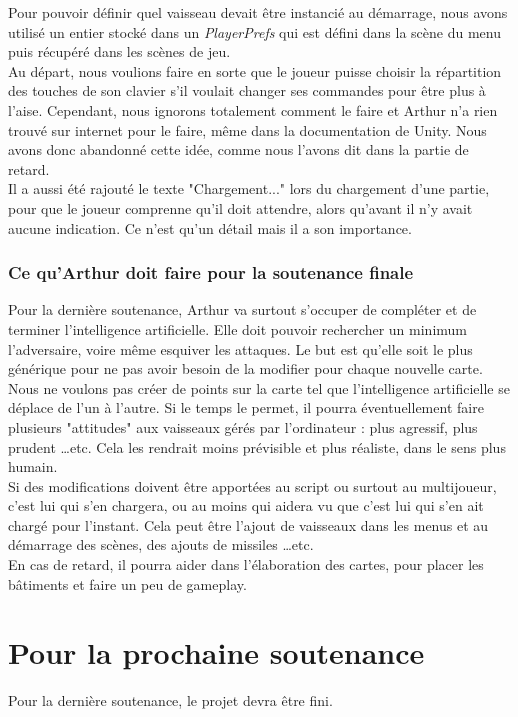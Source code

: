 \documentclass[10pt, titlepage]{report}
\begin{document}
Pour pouvoir définir quel vaisseau devait être instancié au démarrage, nous avons utilisé un entier stocké dans un \textit{PlayerPrefs} qui est défini dans la scène du menu puis récupéré dans les scènes de jeu.\\

Au départ, nous voulions faire en sorte que le joueur puisse choisir la répartition des touches de son clavier s'il voulait changer ses commandes pour être plus à l'aise. Cependant, nous ignorons totalement comment le faire et Arthur n'a rien trouvé sur internet pour le faire, même dans la documentation de Unity. Nous avons donc abandonné cette idée, comme nous l'avons dit dans la partie de retard.\\

Il a aussi été rajouté le texte "Chargement..." lors du chargement d'une partie, pour que le joueur comprenne qu'il doit attendre, alors qu'avant il n'y avait aucune indication. Ce n'est qu'un détail mais il a son importance.\\

\subsection{Ce qu'Arthur doit faire pour la soutenance finale}
Pour la dernière soutenance, Arthur va surtout s'occuper de compléter et de terminer l'intelligence artificielle. Elle doit pouvoir rechercher un minimum l'adversaire, voire même esquiver les attaques. Le but est qu'elle soit le plus générique pour ne pas avoir besoin de la modifier pour chaque nouvelle carte. Nous ne voulons pas créer de points sur la carte tel que l'intelligence artificielle se déplace de l'un à l'autre. Si le temps le permet, il pourra éventuellement faire plusieurs "attitudes" aux vaisseaux gérés par l'ordinateur : plus agressif, plus prudent \dots  etc. Cela les rendrait moins prévisible et plus réaliste, dans le sens plus humain.\\

Si des modifications doivent être apportées au script ou surtout au multijoueur, c'est lui qui s'en chargera, ou au moins qui aidera vu que c'est lui qui s'en ait chargé pour l'instant. Cela peut être l'ajout de vaisseaux dans les menus et au démarrage des scènes, des ajouts de missiles \dots etc.\\

En cas de retard, il pourra aider dans l'élaboration des cartes, pour placer les bâtiments et faire un peu de gameplay.

\chapter{Pour la prochaine soutenance}
Pour la dernière soutenance, le projet devra être fini.\\
\end{document}
